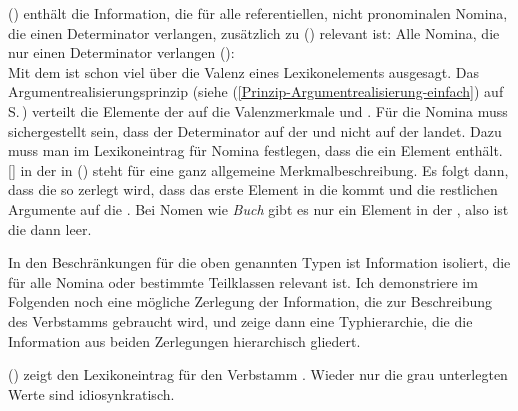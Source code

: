 () enthält die Information, die für alle referentiellen, nicht pronominalen Nomina,
die einen Determinator verlangen, zusätzlich zu () relevant ist:
\ea
Alle Nomina, die nur einen Determinator verlangen ():\\
\z
\largerpage[2]
Mit dem \argstw ist schon viel über die Valenz eines Lexikonelements ausgesagt. Das
Argumentrealisierungsprinzip (siehe (\ref{Prinzip-Argumentrealisierung-einfach}) auf
S.\,\pageref{Prinzip-Argumentrealisierung-einfach}) verteilt die Elemente der \argstl auf die
Valenzmerkmale \spr und \comps. Für die Nomina muss sichergestellt sein, dass der Determinator auf
der \sprl und nicht auf der \compsl landet. Dazu muss man im Lexikoneintrag für Nomina festlegen,
dass die \sprl ein Element enthält. [] in der \sprl in () steht für eine ganz allgemeine
Merkmalbeschreibung. Es folgt dann, dass die \argstl so zerlegt wird, dass das erste
Element in die \sprl kommt und die restlichen Argumente auf die \compsl. Bei Nomen wie \emph{Buch}
gibt es nur ein Element in der \argstl, also ist die \compsl dann leer. 


In den Beschränkungen für die oben genannten Typen ist Information isoliert, die für alle Nomina oder bestimmte Teilklassen
relevant ist. Ich demonstriere im Folgenden noch eine mögliche Zerlegung der Information, die zur Beschreibung
des Verbstamms  gebraucht wird, und zeige dann eine Typhierarchie,
die die Information aus beiden Zerlegungen hierarchisch gliedert.

() zeigt den Lexikoneintrag für den Verbstamm . Wieder nur die
grau unterlegten Werte sind idiosynkratisch.
\ea
{}
\z

